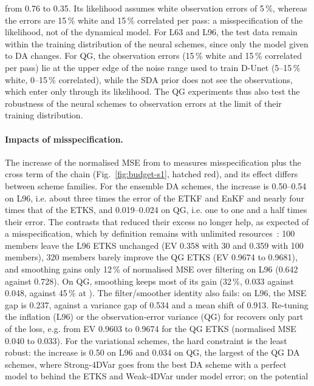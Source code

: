from 0.76 to 0.35. Its likelihood assumes white observation errors of 5\,\%, whereas the \So{}
errors are 15\,\% white and 15\,\% correlated per pass: a misspecification of the likelihood,
not of the dynamical model. For L63 and L96, the \So{} test data remain
within the training distribution of the neural schemes, since only the model given to
DA changes. For QG, the \So{} observation errors (15\,\% white and 15\,\% correlated
per pass) lie at the upper edge of the noise range used to train D-Unet (5--15\,\%
white, 0--15\,\% correlated), while the SDA prior does not see the observations, which
enter only through its likelihood. The QG experiments thus also test the robustness of
the neural schemes to observation errors at the limit of their training distribution.

\paragraph{Impacts of misspecification.}\label{sec:q2-represent}
The increase of the normalised MSE from \Sz{} to \So{} measures misspecification plus
the cross term of the chain (Fig.~\ref{fig:budget-s1}, hatched red), and its effect
differs between scheme families. For the ensemble DA schemes, the increase is
0.50--0.54 on L96, i.e. about three times the \Sz{} error of the ETKF and EnKF and nearly
four times that of the ETKS, and 0.019--0.024 on QG, i.e. one to one and a half times
their \Sz{} error. The contrasts that reduced their
\Sz{} excess no longer help, as expected of a misspecification, which by definition remains
with unlimited resources~\cite{fablet_not_2026}: 100 members leave the L96 ETKS unchanged (EV 0.358 with 30
and 0.359 with 100 members), 320 members barely improve the QG ETKS (EV 0.9674 to 0.9681), and smoothing
gains only 12\,\% of normalised MSE over filtering on L96 (0.642 against 0.728). On QG,
smoothing keeps most of its \Sz{} gain (32\,\%, 0.033 against 0.048, against 45\,\% at
\Sz). The filter/smoother identity also fails: on L96, the
MSE gap is 0.237, against a variance gap of 0.534 and a mean shift of 0.913. Re-tuning
the inflation (L96) or the observation-error variance (QG) for \So{} recovers only part
of the loss, e.g. from EV 0.9603 to 0.9674 for the QG ETKS (normalised MSE 0.040 to
0.033). For the variational schemes,
the hard constraint is the least robust: the increase is 0.50 on L96 and 0.034 on QG,
the largest of the QG DA schemes, where Strong-4DVar goes from the best DA scheme with a
perfect model to behind the ETKS and Weak-4DVar under model error; on the potential
